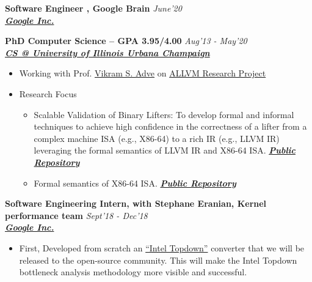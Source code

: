 \documentclass[9pt]{article}
\newenvironment{changemargin}[2]{%
  \begin{list}{}{%
    \setlength{\topsep}{0pt}%
    \setlength{\leftmargin}{#1}%
    \setlength{\rightmargin}{#2}%
    \setlength{\listparindent}{\parindent}%
    \setlength{\itemindent}{\parindent}%
    \setlength{\parsep}{\parskip}%
  }%
  \item[]}{\end{list}
}
\newenvironment{body} {
	\vspace*{-16pt}
	\begin{changemargin}{-0.25in}{-0.5in}
  }	
	{\end{changemargin}
}
\begin{document}
\begin{body}
	\vspace{14pt}

\textbf{Software Engineer , Google Brain} \hfill \emph{June'20}\\
\textbf{\emph{\href{https://www.google.com/intl/en/about/}{Google Inc.}}}

	\vspace{14pt}
 \medskip
        \textbf{PhD Computer Science -- GPA 3.95/4.00}{} \hfill \emph{Aug'13 - May'20}{} \\
	\textbf{\emph{\href{http://cs.illinois.edu/}{CS @ University of Illinois Urbana Champaign}}{}} \\
	\begin{itemize} \itemsep -0pt
            \item  Working with Prof.
              \href{http://vikram.cs.illinois.edu/}{Vikram S.
              Adve} on \href{https://publish.illinois.edu/allvm-project/}{ALLVM
              Research Project}
          \item Research Focus
            \begin{itemize} 
              \item Scalable Validation of Binary Lifters: To develop formal and informal techniques to
achieve high confidence in the correctness of a lifter from
a complex machine ISA (e.g., X86-64) to a rich IR (e.g.,
LLVM IR) leveraging the formal semantics of LLVM IR and X86-64 ISA. \textbf{\emph{{\href{https://github.com/sdasgup3/validating-binary-decompilation}{Public Repository}}}}

              \item Formal semantics of X86-64 ISA. \textbf{\emph{{\href{https://github.com/kframework/X86-64-semantics}{Public Repository}}}}


            \end{itemize} 
        \end{itemize}
    
 \medskip

        \textbf{Software Engineering Intern, with Stephane Eranian, Kernel performance team} \hfill \emph{Sept'18 - Dec'18}\\
	\textbf{\emph{\href{https://www.google.com/intl/en/about/}{Google Inc.}}}
	\begin{itemize} \itemsep -0pt


        \item First, Developed from scratch an
        \href{https://ieeexplore.ieee.org/document/6844459}{``Intel Topdown''}
        converter that we will be released to the open-source community. This will
        make the Intel Topdown bottleneck analysis methodology more visible and
        successful.



\end{itemize}
\end{body}
\end{document}
